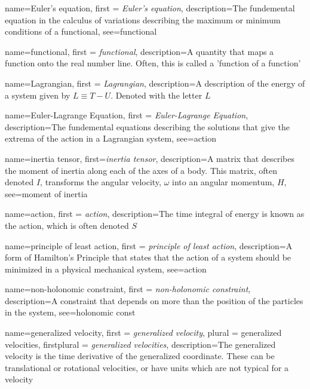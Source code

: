 {
    name=Euler's equation,
    first = {\textit{Euler's equation}},
    description={The fundemental equation in the calculus of variations describing the maximum or minimum conditions of a functional},
    see={functional}
}

{
    name=functional,
    first = {\textit{functional}},
    description={A quantity that maps a function onto the real number line. Often,  this is called a 'function of a function'}
}

{
    name=Lagrangian,
    first = {\textit{Lagrangian}},
    description={A description of the energy of a system given by $L\equiv T-U$. Denoted with the letter $L$}
}

{
    name=Euler-Lagrange Equation,
    first = {\textit{Euler-Lagrange Equation}},
    description={The fundemental equations describing the solutions that give the extrema of the action in a Lagrangian system},
    see={action}
}

{
    name={inertia tensor},
    first=\textit{inertia tensor},
    description={A matrix that describes the moment of inertia along each of the axes of a body. This matrix, often denoted $I$, transforms the angular velocity, $\omega$ into an angular momentum, $H$},
    see={moment of inertia}
}

{
    name=action,
    first = {\textit{action}},
    description={The time integral of energy is known as the action, which is often denoted $S$}
}

{
    name=principle of least action,
    first = {\textit{principle of least action}},
    description={A form of Hamilton's Principle that states that the action of a system should be minimized in a physical mechanical system},
    see={action}
}

{
    name=non-holonomic constraint,
    first = {\textit{non-holonomic constraint}},
    description={A constraint that depends on more than the position of the particles in the system},
    see={holonomic const}
}

{
    name=generalized velocity,
    first = {\textit{generalized velocity}},
    plural = {generalized velocities},
    firstplural = {\textit{generalized velocities}},
    description={The generalized velocity is the time derivative of the generalized coordinate. These can be translational or rotational velocities, or have units which are not typical for a velocity}
}

